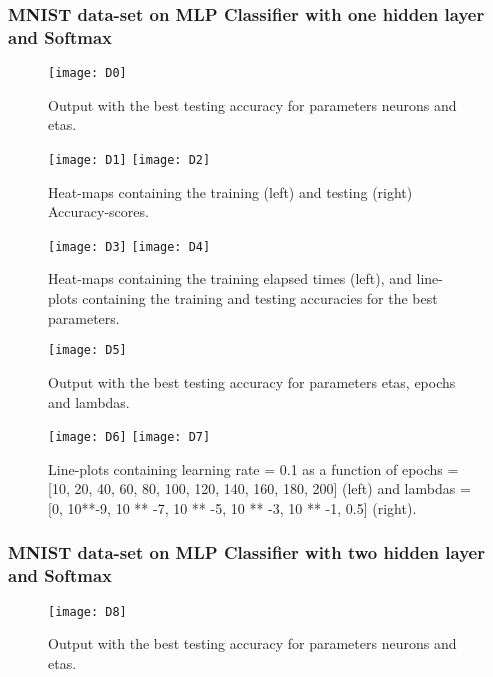 \subsubsection{MNIST data-set on MLP Classifier with one hidden layer and Softmax}
\label{chap:MNIST data-set on MLP Classifier with one hidden layer and Softmax}

\begin{figure}[H]
\label{fig:D0}
\centering
\texttt{[image: D0]}
\caption{Output with the best testing accuracy for parameters neurons and etas.}
\end{figure}

\begin{figure}[H]
\label{fig:D1}
\centering
\texttt{[image: D1]}
\texttt{[image: D2]}
\caption{Heat-maps containing the training (left) and testing (right) Accuracy-scores.}
\end{figure}

\begin{figure}[H]
\label{fig:D2}
\centering
\texttt{[image: D3]}
\texttt{[image: D4]}
\caption{Heat-maps containing the training elapsed times (left), and line-plots containing the training and testing accuracies for the best parameters.}
\end{figure}

\begin{figure}[H]
\label{fig:D3}
\centering
\texttt{[image: D5]}
\caption{Output with the best testing accuracy for parameters etas, epochs and lambdas.}
\end{figure}

\begin{figure}[H]
\label{fig:D4}
\centering
\texttt{[image: D6]}
\texttt{[image: D7]}
\caption{Line-plots containing learning rate = 0.1 as a function of epochs = [10, 20, 40, 60, 80, 100, 120, 140, 160, 180, 200] (left) and lambdas = [0, 10**-9, 10 ** -7, 10 ** -5, 10 ** -3, 10 ** -1, 0.5] (right).}
\end{figure}

\subsubsection{MNIST data-set on MLP Classifier with two hidden layer and Softmax}
\label{chap:MNIST data-set on MLP Classifier with two hidden layer and Softmax}

\begin{figure}[H]
\label{fig:D5}
\centering
\texttt{[image: D8]}
\caption{Output with the best testing accuracy for parameters neurons and etas.}
\end{figure}

